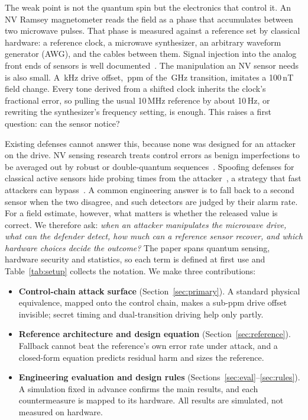 \documentclass[conference,9pt]{IEEEtran}
\begin{document}
The weak point is not the quantum spin but the electronics that control it. An NV Ramsey magnetometer reads the field as a phase that accumulates between two microwave
pulses. That phase is measured against a reference set by classical hardware: a reference clock, a
microwave synthesizer, an arbitrary waveform generator (AWG), and the cables between them. Signal
injection into the analog front ends of sensors is well documented~\cite{kune2013ghost,shoukry2013abs}.
The manipulation an NV sensor needs is also small. A \SpoofOffsetkHz{}\,kHz drive offset,
\SpoofOffsetPpm{}\,ppm of the \UpperLineGHz{}\,GHz transition, imitates a 100\,nT field change.
Every tone derived from a shifted clock inherits the clock's fractional error, so pulling the
usual 10\,MHz reference by about 10\,Hz, or rewriting the synthesizer's frequency setting, is
enough. This raises a first question: can the sensor notice?

Existing defenses cannot answer this, because none was designed for an attacker on the drive. NV sensing research treats control errors as benign
imperfections to be averaged out by robust or double-quantum
sequences~\cite{oshnik2022robust,fang2013quantumbeats,hart2021dq}. Spoofing defenses for
classical active sensors hide probing times from the attacker~\cite{shoukry2015pycra}, a strategy
that fast attackers can bypass~\cite{shin2016sampling}. A common engineering answer is to fall back to a second sensor when the two disagree, and such
detectors are judged by their alarm rate. For a field estimate, however, what matters is whether the
released value is correct. We therefore ask: \emph{when an attacker manipulates the microwave drive, what can the defender
detect, how much can a reference sensor recover, and which hardware choices decide the outcome?} The paper spans quantum sensing, hardware security and
statistics, so each term is defined at first use and Table~\ref{tab:setup} collects the notation.
We make three contributions:
\begin{itemize}
\item \textbf{Control-chain attack surface} (Section~\ref{sec:primary}). A standard physical equivalence, mapped onto the control chain, makes a sub-ppm drive offset
invisible; secret timing and dual-transition driving help only partly.
\item \textbf{Reference architecture and design equation} (Section~\ref{sec:reference}). Fallback cannot beat the reference's own error rate under attack, and a closed-form equation
predicts residual harm and sizes the reference.
\item \textbf{Engineering evaluation and design rules} (Sections~\ref{sec:eval}--\ref{sec:rules}).
A simulation fixed in advance confirms the main results, and each countermeasure is mapped to its
hardware. All results are simulated, not measured on hardware.
\end{itemize}
\end{document}
